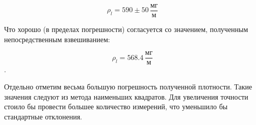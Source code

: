 \documentclass[12pt,a4paper]{scrartcl}
\begin{document}
		$$\rho_l = 590 \pm 50 \, \frac{\text{мг}}{\text{м}}$$
		
		Что хорошо (в пределах погрешности) согласуется со значением, полученным непосредственным взвешиванием:
		
		$$\rho_l = 568.4 \, \frac{\text{мг}}{\text{м}}$$.
		
		Отдельно отметим весьма большую погрешность полученной плотности. Такие значения следуют из метода наименьших квадратов. Для увеличения точности стоило бы провести большее количество измерений, что уменьшило бы стандартные отклонения.
\end{document}
